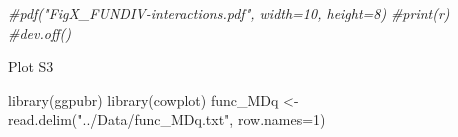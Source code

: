 \documentclass[]{interact}
\theoremstyle{plain}%
\theoremstyle{definition}
\theoremstyle{remark}
\newenvironment{Shaded}{\begin{snugshade}}{\end{snugshade}}
\newcommand{\AttributeTok}[1]{\textcolor[rgb]{0.77,0.63,0.00}{#1}}
\newcommand{\CommentTok}[1]{\textcolor[rgb]{0.56,0.35,0.01}{\textit{#1}}}
\newcommand{\DecValTok}[1]{\textcolor[rgb]{0.00,0.00,0.81}{#1}}
\newcommand{\FunctionTok}[1]{\textcolor[rgb]{0.00,0.00,0.00}{#1}}
\newcommand{\NormalTok}[1]{#1}
\newcommand{\OtherTok}[1]{\textcolor[rgb]{0.56,0.35,0.01}{#1}}
\newcommand{\StringTok}[1]{\textcolor[rgb]{0.31,0.60,0.02}{#1}}
\begin{document}
\begin{Shaded}
\begin{Highlighting}[]
\CommentTok{\#pdf("FigX\_FUNDIV{-}interactions.pdf", width=10, height=8)}
\CommentTok{\#print(r)}
\CommentTok{\#dev.off()}
\end{Highlighting}
\end{Shaded}

Plot S3

\begin{Shaded}
\begin{Highlighting}[]
\FunctionTok{library}\NormalTok{(ggpubr)}
\FunctionTok{library}\NormalTok{(cowplot)}
\NormalTok{func\_MDq }\OtherTok{\textless{}{-}} \FunctionTok{read.delim}\NormalTok{(}\StringTok{"../Data/func\_MDq.txt"}\NormalTok{, }\AttributeTok{row.names=}\DecValTok{1}\NormalTok{)}


\end{Highlighting}
\end{Shaded}
\end{document}
